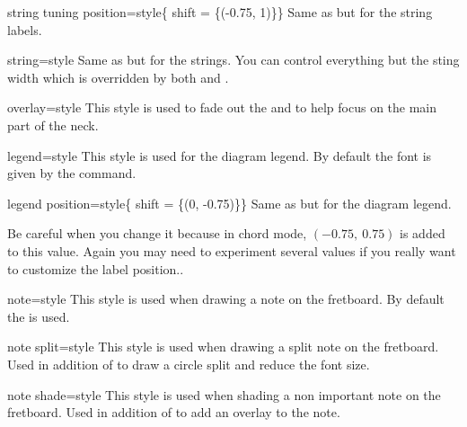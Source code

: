 \documentclass[a4paper]{article}
\begin{document}
\begin{docKey}[tikz][]{string tuning position}{=style}{\{ shift = \{(-0.75, 1)\}\}}
  Same as  but for the string labels.
\end{docKey}

\begin{docKey}[tikz][]{string}{=style}{}
  Same as  but for the strings. You can control
  everything but the sting width which is overridden by both
   and .
\end{docKey}

\begin{docKey}[tikz][]{overlay}{=style}{}
  This style is used to fade out the  and
   to help focus on the main part of the neck.
\end{docKey}

\begin{docKey}[tikz][]{legend}{=style}{}
  This style is used for the diagram legend. By default the font is given
  by the  command.
\end{docKey}

\begin{docKey}[tikz][]{legend position}{=style}{\{ shift = \{(0, -0.75)\}\}}
  Same as  but for the diagram legend.

  Be careful when you change it because in chord mode, $(-0.75,~0.75)$ is
  added to this value. Again you may need to experiment several values if
  you really want to customize the label position..
\end{docKey}

\begin{docKey}[tikz][]{note}{=style}{}
  This style is used when drawing a note on the fretboard. By default the
   is used.
\end{docKey}

\begin{docKey}[tikz][]{note split}{=style}{}
  This style is used when drawing a split note on the fretboard. Used in
  addition of  to draw a circle split and reduce the font
  size.
\end{docKey}

\begin{docKey}[tikz][]{note shade}{=style}{}
  This style is used when shading a non important note on the
  fretboard. Used in addition of  to add an overlay to
  the note.
\end{docKey}
\end{document}
